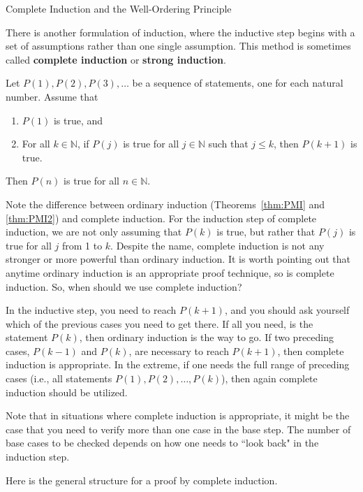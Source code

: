 \begin{section}{Complete Induction and the Well-Ordering Principle}\label{sec:CompleteInduction}

There is another formulation of induction, where the inductive step begins with a set of assumptions rather than one single assumption.  This method is sometimes called \textbf{complete induction} or \textbf{strong induction}.  

\begin{theorem}
Let $P(1), P(2), P(3), \ldots$ be a sequence of statements, one for each natural number.  Assume that
\begin{enumerate}[label=\textrm{(\roman*)}]
\item $P(1)$ is true, and
\item For all $k \in \mathbb{N}$, if $P(j)$ is true for all $j\in \mathbb{N}$ such that $j \leq k$, then $P(k+1)$ is true.  
\end{enumerate}
Then $P(n)$ is true for all $n\in\mathbb{N}$.
\end{theorem}

Note the difference between ordinary induction (Theorems~\ref{thm:PMI} and \ref{thm:PMI2}) and complete induction. For the induction step of complete induction, we are not only assuming that $P(k)$ is true, but rather that $P(j)$ is true for all $j$ from 1 to $k$.  Despite the name, complete induction is not any stronger or more powerful than ordinary induction.  It is worth pointing out that anytime ordinary induction is an appropriate proof technique, so is complete induction. So, when should we use complete induction?

In the inductive step, you need to reach $P(k+1)$, and you should ask yourself which of the previous cases you need to get there. If all you need, is the statement $P(k)$, then ordinary induction is the way to go. If two preceding cases, $P(k - 1)$ and $P(k)$, are necessary to reach $P(k + 1)$, then complete induction is appropriate. In the extreme, if one needs the full range of preceding cases (i.e., all statements $P(1), P(2),\ldots,P(k)$), then again complete induction should be utilized.

Note that in situations where complete induction is appropriate, it might be the case that you need to verify more than one case in the base step. The number of base cases to be checked depends on how one needs to ``look back" in the induction step.

\begin{skeleton}
Here is the general structure for a proof by complete induction.


\end{skeleton}
\end{section}
